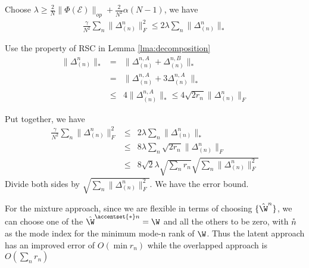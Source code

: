 Choose $\lambda \geq \frac{2}{N}\|\Phi(\mathcal{E})\|_{op}+ \frac{2}{N^2}\alpha(N-1)$, we have
\begin{eqnarray}
\label{eqn:upperbound}
\frac{\gamma}{N^2}\sum_n \|\Delta^{n}_{(n)} \|_F^2 \leq 2\lambda  \sum_n\|  \Delta^n_{(n)}\|_* 
\end{eqnarray}

Use the property of RSC in Lemma \ref{lma:decomposition}
\begin{eqnarray}
\| \Delta^n_{(n)}\|_*  & = &\|\Delta^{n,A}_{(n)} + \Delta^{n,B}_{(n)}\|_* \nonumber \\
& = &\|\Delta^{n,A}_{(n)} + 3\Delta^{n,A}_{(n)}\|_* \nonumber\\
 &\leq & 4 \|\Delta^{n,A}_{(n)}\|_*   \leq  4\sqrt{2r_n}\|\Delta^{n}_{(n)} \|_F  
\end{eqnarray}

Put  together, we have 
\begin{eqnarray}
\frac{\gamma}{N^2}\sum_n \|\Delta^{n}_{(n)} \|_F^2 &  \leq &  2\lambda  \sum_n\|  \Delta^n_{(n)}\|_*  \nonumber \\
& \leq &  8\lambda\sum_n\sqrt{2r_n}\|\Delta^{n}_{(n)} \|_F \nonumber\\
& \leq & 8\sqrt{2}\lambda\sqrt{\sum_n r_n} \sqrt{\sum_n \|\Delta^n_{(n)}\|_F^2} \nonumber
\end{eqnarray}
Divide both sides  by  $\sqrt{\sum_n \|\Delta^n_{(n)}\|_F^2} $. We have the error bound.

For the mixture approach, since we are flexible in terms of choosing $\{\hat{\W}^n\}$, we can choose one of the $\hat{\W}^{\accentset{\ast} n} = \W$ and all the others to be zero, with $\accentset{\ast} n$ as the mode index for the minimum mode-n rank of $\W$. Thus the latent approach has an improved error of $O(\min r_n)$ while the overlapped approach is $O( \sum\limits_n r_n)$
